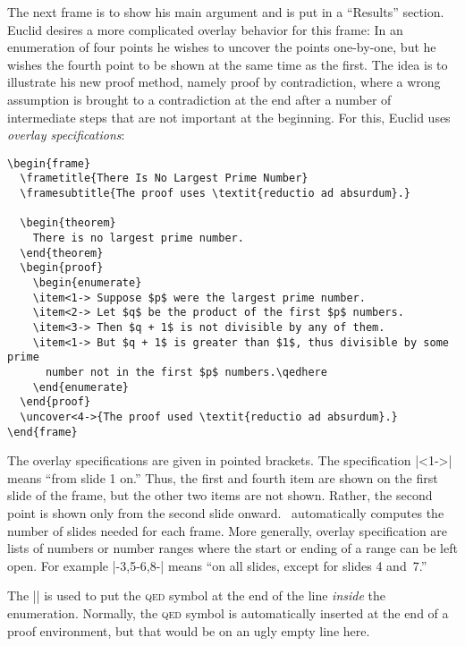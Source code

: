 The next frame is to show his main argument and is put in a ``Results'' section. Euclid desires a more complicated overlay behavior for this frame: In an enumeration of four points he wishes to uncover the points one-by-one, but he wishes the fourth point to be shown at the same time as the first. The idea is to illustrate his new proof method, namely proof by contradiction, where a wrong assumption is brought to a contradiction at the end after a number of intermediate steps that are not important at the beginning. For this, Euclid uses \emph{overlay specifications}:
\begin{verbatim}
\begin{frame}
  \frametitle{There Is No Largest Prime Number}
  \framesubtitle{The proof uses \textit{reductio ad absurdum}.}

  \begin{theorem}
    There is no largest prime number.
  \end{theorem}
  \begin{proof}
    \begin{enumerate}
    \item<1-> Suppose $p$ were the largest prime number.
    \item<2-> Let $q$ be the product of the first $p$ numbers.
    \item<3-> Then $q + 1$ is not divisible by any of them.
    \item<1-> But $q + 1$ is greater than $1$, thus divisible by some prime
      number not in the first $p$ numbers.\qedhere
    \end{enumerate}
  \end{proof}
  \uncover<4->{The proof used \textit{reductio ad absurdum}.}
\end{frame}
\end{verbatim}

The overlay specifications are given in pointed brackets. The specification |<1->| means ``from slide 1 on.'' Thus, the first and fourth item are shown on the first slide of the frame, but the other two items are not shown. Rather, the second point is shown only from the second slide onward. \beamer\ automatically computes the number of slides needed for each frame. More generally, overlay specification are lists of numbers or number ranges where the start or ending of a range can be left open. For example |-3,5-6,8-| means ``on all slides, except for slides 4 and~7.''

The |\qedhere| is used to put the \textsc{qed} symbol at the end of the line \emph{inside} the enumeration. Normally, the \textsc{qed} symbol is automatically inserted at the end of a proof environment, but that would be on an ugly empty line here.

